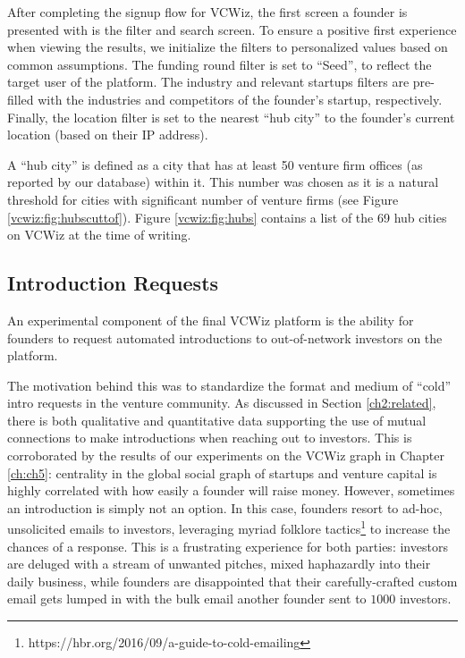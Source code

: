 After completing the signup flow for VCWiz, the first screen a founder is presented with is the filter and search screen. To ensure a positive first experience when viewing the results, we initialize the filters to personalized values based on common assumptions. The funding round filter is set to ``Seed'', to reflect the target user of the platform. The industry and relevant startups filters are pre-filled with the industries and competitors of the founder's startup, respectively. Finally, the location filter is set to the nearest ``hub city'' to the founder's current location (based on their IP address).

A ``hub city'' is defined as a city that has at least 50 venture firm offices (as reported by our database) within it. This number was chosen as it is a natural threshold for cities with significant number of venture firms (see Figure \ref{vcwiz:fig:hubscuttof}). Figure \ref{vcwiz:fig:hubs} contains a list of the 69 hub cities on VCWiz at the time of writing.

\subsection{Introduction Requests}
\label{chap4:introrequests}

An experimental component of the final VCWiz platform is the ability for founders to request automated introductions to out-of-network investors on the platform.

The motivation behind this was to standardize the format and medium of ``cold'' intro requests in the venture community. As discussed in Section \ref{ch2:related}, there is both qualitative and quantitative data supporting the use of mutual connections to make introductions when reaching out to investors. This is corroborated by the results of our experiments on the VCWiz graph in Chapter \ref{ch:ch5}: centrality in the global social graph of startups and venture capital is highly correlated with how easily a founder will raise money. However, sometimes an introduction is simply not an option. In this case, founders resort to ad-hoc, unsolicited emails to investors, leveraging myriad folklore tactics\footnote{https://hbr.org/2016/09/a-guide-to-cold-emailing} to increase the chances of a response. This is a frustrating experience for both parties: investors are deluged with a stream of unwanted pitches, mixed haphazardly into their daily business, while founders are disappointed that their carefully-crafted custom email gets lumped in with the bulk email another founder sent to $1000$ investors.

